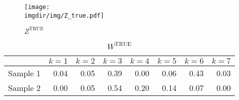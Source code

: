 \documentclass[10pt]{article} %
\def\true{\text{TRUE}}
\def\imgdir{../../results/test-sim-6-7/maxtemp1000-ntempts20-degree4-N500}
\begin{document}
\begin{figure}[H]
  \begin{center}  %
    \texttt{[image: \\imgdir/img/Z\_true.pdf]}
  \end{center}
  \caption{$Z^\true$}
  \label{fig:Z-true}
\end{figure}

\begin{table}[ht]
  \centering
  \begin{tabular}{rrrrrrrr}
    \hline
    & $k=1$ & $k=2$ & $k=3$ & $k=4$ & $k=5$ & $k=6$ & $k=7$ \\
    \hline
    Sample 1 & 0.04 & 0.05 & 0.39 & 0.00 & 0.06 & 0.43 & 0.03 \\
    Sample 2 & 0.00 & 0.05 & 0.54 & 0.20 & 0.14 & 0.07 & 0.00 \\
    \hline
  \end{tabular}
  \caption{$W^\true$}
  \label{tab:W-true}
\end{table}
\end{document}
